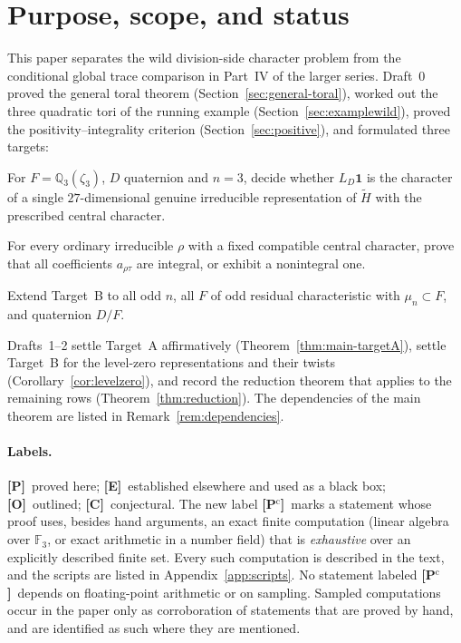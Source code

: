\documentclass[11pt]{article}
\newcommand{\Q}{\mathbb Q}
\newcommand{\Fq}{\mathbb F}
\newcommand{\tH}{\widetilde H}
\newcommand{\Ptag}{\textnormal{\textbf{[P]}}}
\newcommand{\Pctag}{\textnormal{\textbf{[P$^{\mathrm c}$]}}}
\newcommand{\Etag}{\textnormal{\textbf{[E]}}}
\newcommand{\Otag}{\textnormal{\textbf{[O]}}}
\newcommand{\Ctag}{\textnormal{\textbf{[C]}}}
\theoremstyle{plain}
\theoremstyle{definition}
\begin{document}
\section{Purpose, scope, and status}\label{sec:intro}
This paper separates the wild division-side character problem from the
conditional global trace comparison in Part~IV of the larger series.
Draft~0 proved the general toral theorem (Section~\ref{sec:general-toral}),
worked out the three quadratic tori of the running example
(Section~\ref{sec:examplewild}), proved the positivity--integrality
criterion (Section~\ref{sec:positive}), and formulated three targets:
\begin{description}[style=nextline]
\item[Target A] For $F=\Q_3(\zeta_3)$, $D$ quaternion and $n=3$, decide
whether $L_D\mathbf1$ is the character of a single $27$-dimensional
genuine irreducible representation of $\tH$ with the prescribed central
character.
\item[Target B] For every ordinary irreducible $\rho$ with a fixed
compatible central character, prove that all coefficients $a_{\rho\tau}$
are integral, or exhibit a nonintegral one.
\item[Target C] Extend Target~B to all odd $n$, all $F$ of odd residual
characteristic with $\mu_n\subset F$, and quaternion $D/F$.
\end{description}
Drafts~1--2 settle Target~A affirmatively (Theorem~\ref{thm:main-targetA}),
settle Target~B for the level-zero representations and their twists
(Corollary~\ref{cor:levelzero}), and record the reduction theorem that
applies to the remaining rows (Theorem~\ref{thm:reduction}).  The
dependencies of the main theorem are listed in
Remark~\ref{rem:dependencies}.

\paragraph{Labels.}
\Ptag\ proved here; \Etag\ established elsewhere and used as a black
box; \Otag\ outlined; \Ctag\ conjectural.  The new label \Pctag\ marks
a statement whose proof uses, besides hand arguments, an exact finite
computation (linear algebra over $\Fq_3$, or exact arithmetic in a
number field) that is \emph{exhaustive} over an explicitly described
finite set.  Every such computation is described in the text, and the
scripts are listed in Appendix~\ref{app:scripts}.  No statement
labeled \Pctag\ depends on floating-point arithmetic or on sampling.
Sampled computations occur in the paper only as corroboration of
statements that are proved by hand, and are identified as such where
they are mentioned.
\end{document}
